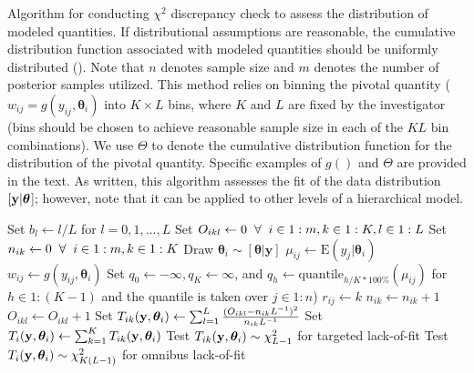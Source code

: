 \documentclass[12pt,english]{article}
\begin{document}
\begin{spacing}{1.9}
\begin{algorithm}
\caption{Algorithm for conducting $\chi^2$ discrepancy check to assess the distribution of modeled quantities.  If distributional assumptions are reasonable, the cumulative distribution function associated with modeled quantities should be uniformly distributed (\citep{Johnson2004,YuanJohnson2012}). Note that $n$ denotes sample size and $m$ denotes the number of posterior samples utilized.  This method relies on binning the pivotal quantity ($w_{ij} = g(y_{ij},\boldsymbol{\theta}_i)$ into $K \times L$ bins, where $K$ and $L$ are fixed by the investigator (bins should be chosen to achieve reasonable sample size in each of the $KL$ bin combinations).  We use $\Theta$ to denote the cumulative distribution function for the distribution of the pivotal quantity.  Specific examples of $g()$ and $\Theta$ are provided in the text.  As written, this algorithm assesses the fit of the data distribution $[{\bf y}|\boldsymbol{\theta}$]; however, note that it can be applied to other levels of a hierarchical model.}
\label{alg:pivot}
\begin{algorithmic}
\STATE Set $b_l \leftarrow l/L$ for $l=0,1,\hdots,L$
\STATE Set $O_{ikl} \leftarrow 0 \hspace{2mm} \forall \hspace{2mm} i \in 1:m, k \in 1:K, l \in 1:L$
\STATE Set $n_{ik} \leftarrow 0 \hspace{2mm} \forall \hspace{2mm} i \in 1:m, k \in 1:K$
  \STATE Draw $\boldsymbol{\theta}_i \sim [\boldsymbol{\theta}|\textbf{y}]$
    \STATE $\mu_{ij} \leftarrow \textrm{E}(y_j|\boldsymbol{\theta}_i)$
    \STATE $w_{ij} \leftarrow g(y_{ij},\boldsymbol{\theta}_i)$
  \ENDFOR
  \STATE Set $q_0 \leftarrow -\infty, q_{K} \leftarrow \infty$, and $q_h \leftarrow \textrm{quantile}_{h/K*100\%}(\mu_{ij})$ for $h \in 1:(K-1)$ and the quantile is taken over $j \in 1:n$)
        \STATE $r_{ij} \leftarrow k$
        \STATE $n_{ik} \leftarrow n_{ik}+1$
      \ENDIF
    \ENDFOR
      \IF{$\Theta(w_{ij}) \in (b_{l-1},b_l]$ \& $r_{ij}=k$}
        \STATE $O_{ikl} \leftarrow O_{ikl}+1$
      \ENDIF
    \ENDFOR
    \STATE Set $T_{ik}({\bf y},\boldsymbol{\theta}_i) \leftarrow \sum_{l=1}^L \frac{(O_{ikl}-n_{ik}L^{-1})^2}{n_{ik}L^{-1}} $
  \ENDFOR
  \STATE Set $T_i({\bf y},\boldsymbol{\theta}_i) \leftarrow \sum_{k=1}^K T_{ik}({\bf y},\boldsymbol{\theta}_i)$
\ENDFOR
\STATE Test $T_{ik}({\bf y},\boldsymbol{\theta}_i) \sim \chi^2_{L-1}$ for targeted lack-of-fit
\STATE Test $T_{i}({\bf y},\boldsymbol{\theta}_i) \sim \chi^2_{K(L-1)}$ for omnibus lack-of-fit
\end{algorithmic}
\end{algorithm}



\end{spacing}
\end{document}
